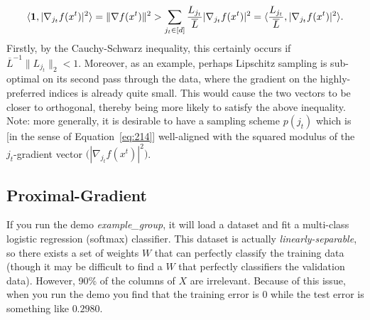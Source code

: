 \documentclass{article}
\begin{document}
\begin{align}
\langle \mathbf{1}, |\nabla_{j_t} f(x^t)|^2\rangle = \|\nabla f(x^t)\|^2 > \sum_{j_t\in [d]} \frac{L_{j_t}}{\overline{L}}
|\nabla_{j_t} f(x^t)|^2 = \langle \frac{L_{j_t}}{\overline{L}}, |\nabla_{j_t}
  f(x^t)|^2\rangle.
  \label{eq:214}
\end{align}
Firstly, by the Cauchy-Schwarz inequality, this certainly occurs if
$\overline{L}^{-1}\|L_{j_t}\|_2 < 1$. Moreover, as an example, perhaps
Lipschitz sampling is sub-optimal on its second pass through the data, where
the gradient on the highly-preferred indices is already quite small. This would
cause the two vectors to be closer to orthogonal, thereby being more likely to
satisfy the above inequality. Note: more generally, it is desirable to have a
sampling scheme $p(j_t)$ which is [in the sense of Equation~\eqref{eq:214}]
well-aligned with the squared modulus of the $j_t$-gradient vector
$\big(|\nabla_{j_t} f(x^t)|^2 \big)$.



\subsection{Proximal-Gradient}


If you run the demo \emph{example\_group}, it will load a dataset and fit a multi-class logistic regression (softmax) classifier. This dataset is actually \emph{linearly-separable}, so there exists a set of weights $W$ that can perfectly classify the training data (though it may be difficult to find a $W$ that perfectly classifiers the validation data). However, 90\% of the columns of $X$ are irrelevant. Because of this issue, when you run the demo you find that the training error is $0$ while the test error is something like $0.2980$.
\end{document}
